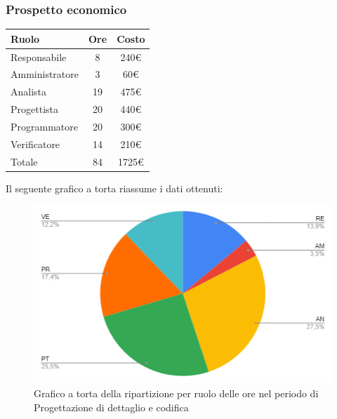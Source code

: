 {{{{{{{{\subsubsection{Prospetto economico}\label{PreventivoFaseDiProgettazioneDiDettaglioECodificaProspettoEconomicoPeriodo1}
\quad
\def\tabularxcolumn#1{m{#1}}
{
	\begin{center}
		\renewcommand{\arraystretch}{1.4}
		\begin{tabularx}{7cm}{|X|c|c|}
			\hline
			\rowcolor{airforceblue}
			\textbf{Ruolo} & \textbf{Ore} & \textbf{Costo}\\
			\hline
			Responsabile & 8 & 240\euro\\
			\hline
			Amministratore & 3 & 60\euro\\
			\hline
			Analista & 19 & 475\euro\\
			\hline
			Progettista & 20 & 440\euro\\
			\hline
			Programmatore & 20 & 300\euro\\
			\hline
			Verificatore & 14 & 210\euro\\
			\hline
			Totale & 84 & 1725\euro\\
			\hline
		\end{tabularx}
	\end{center}

Il seguente grafico a torta riassume i dati ottenuti:
\begin{figure}[!ht]
	\begin{center}
		\includegraphics[width=0.8\linewidth]{../immagini/pdp/torta_progettazione_dettaglio_periodo1.png}
		\caption{Grafico a torta della ripartizione per ruolo delle ore nel periodo di Progettazione
			di dettaglio e codifica}
	\end{center}
\end{figure}

}}}}}}}}}
